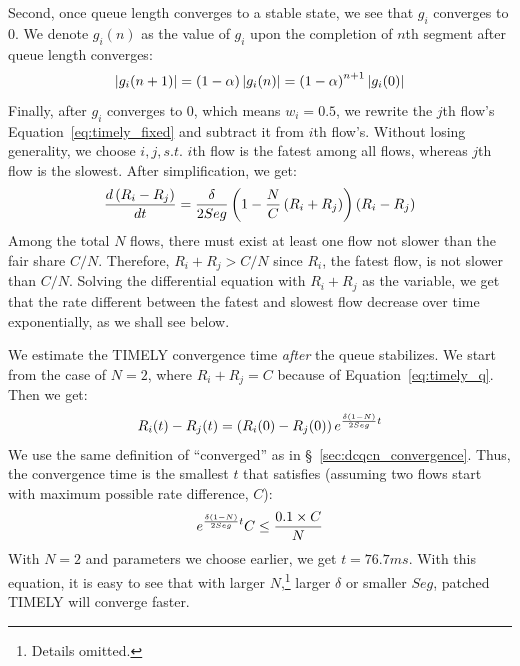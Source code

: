 Second, once queue length converges to a stable state, we see that $g_i$ converges to 0.
We denote ${g_i}(n)$ as the value of $g_i$ upon the completion of $n$th segment after queue
length converges:
\begin{equation}
\small
\left| {{g_i}(n + 1)} \right| = \left( {1 - \alpha} \right)\left| {{g_i}(n)} \right| = {\left( {1 - \alpha} \right)}^{n+1} \left| {{g_i}(0)} \right|
\end{equation}
Finally, after $g_i$ converges to 0, which means $w_i=0.5$, we rewrite the $j$th flow's Equation~\ref{eq:timely_fixed} 
and subtract it from $i$th flow's. Without losing generality, we choose $i,j, s.t.$ $i$th flow is the fatest among all flows,
whereas $j$th flow is the slowest. After simplification, we get:
\begin{equation}
\small
\frac{{d\left( {{R_i} - {R_j}} \right)}}{{dt}} = \frac{\delta }{{2Seg}}\left( {1 - \frac{N}{C}\left( {{R_i} + {R_j}} \right)} \right)\left( {{R_i} - {R_j}} \right)
\end{equation}
Among the total $N$ flows, there must exist at least one flow not slower than the fair share $C/N$.
Therefore, ${{R_i} + {R_j}} > C/N$ since $R_i$, the fatest flow, is not slower than $C/N$.
Solving the differential equation with ${{R_i} + {R_j}}$ as the variable, we get that the rate 
different between the fatest and slowest flow decrease over time exponentially, as we shall see below. 

 We estimate the TIMELY convergence time {\em after}
the queue stabilizes. We start from the case of $N=2$, where $R_i + R_j = C$
because of Equation~\ref{eq:timely_q}.
Then we get:
\begin{equation}
\small
{R_i}(t) - {R_j}(t) = \left( {{R_i}(0) - {R_j}(0)} \right){e^{\frac{{\delta (1 - N)}}{{2Seg}}t}}
\end{equation}
We use the same definition of ``converged'' as in
\S~\ref{sec:dcqcn_convergence}. Thus, the convergence
time is the smallest $t$ that satisfies (assuming two flows start with maximum possible rate difference, $C$):
\begin{equation}
\small
{e^{\frac{{\delta (1 - N)}}{{2Seg}}t}}C \le \frac{{0.1 \times C}}{N}
\end{equation}
With $N=2$ and parameters we choose earlier, we get $t = 76.7ms$. With this equation, it is easy to see that
with larger $N$,\footnote{Details omitted.} larger $\delta$ or smaller $Seg$, patched TIMELY will converge faster.


